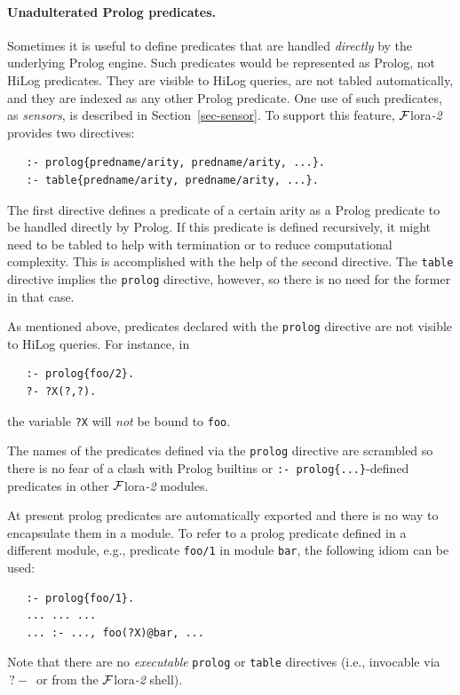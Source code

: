 \documentclass[11pt]{article}
\newcommand{\FLORA}{{\mbox{\sc ${\cal F}${lora}\rm\emph{-2}}}\xspace}
\newcommand{\FLSYSTEM}{\FLORA}
\newcommand{\query}{\mbox{$\, ?\! - \, $}}                  %
\begin{document}
\paragraph{Unadulterated Prolog predicates.}
Sometimes it is useful to define predicates that are handled
\emph{directly} by the underlying Prolog engine. Such predicates would be
represented as Prolog, not HiLog predicates. They are visible to
HiLog queries, are not tabled automatically,
and they are indexed as any other Prolog predicate.
One use of such predicates, as \emph{sensors}, is described in
Section~\ref{sec-sensor}.
To support this feature, \FLSYSTEM provides two directives:
\begin{verbatim}
   :- prolog{predname/arity, predname/arity, ...}.
   :- table{predname/arity, predname/arity, ...}.
\end{verbatim}
The first directive defines a predicate of a certain arity as a Prolog
predicate to be handled directly by Prolog. If this predicate is defined
recursively, it might need to be tabled to help with termination or to
reduce computational complexity. This is accomplished with the help of the
second directive. The \texttt{table} directive implies the \texttt{prolog}
directive, however, so there is no need for the former in that case.

As mentioned above, predicates declared with the \texttt{prolog} directive
are not visible to HiLog queries. For instance, in
\begin{verbatim}
   :- prolog{foo/2}.
   ?- ?X(?,?).
\end{verbatim}
the variable \texttt{?X} will \emph{not} be bound to \texttt{foo}.  

The names of the predicates defined via the \texttt{prolog} directive 
are scrambled so there is no fear of a clash with Prolog builtins or
\texttt{:- prolog\{...\}}-defined  predicates in other \FLSYSTEM modules.

At present prolog predicates are automatically exported and there is no way
to encapsulate them in a module. To refer to a prolog predicate defined in
a different module, e.g., predicate \texttt{foo/1} in module \texttt{bar},
the following idiom can be used:
\begin{verbatim}
   :- prolog{foo/1}.
   ... ... ...
   ... :- ..., foo(?X)@bar, ...
\end{verbatim}
Note that there are no \emph{executable}  \texttt{prolog} or \texttt{table}
directives (i.e., invocable via $\query$ or from the \FLSYSTEM shell).
\end{document}
